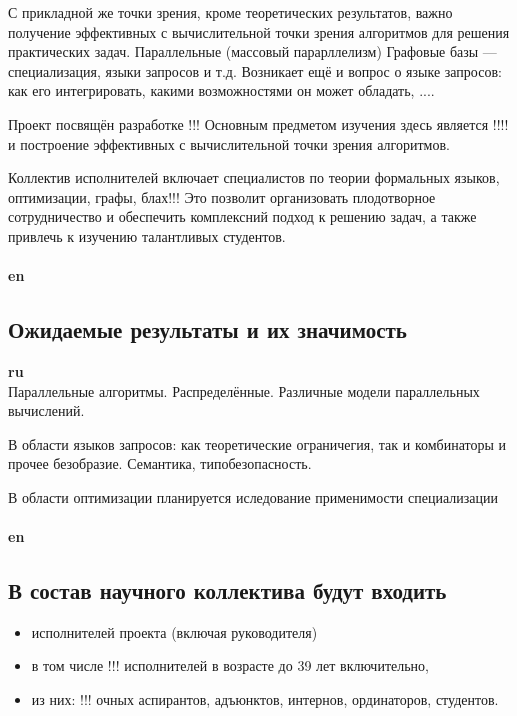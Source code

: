 \documentclass[12pt]{article}  %
\theoremstyle{remark}
\begin{document}
С прикладной же точки зрения, кроме теоретических результатов, важно получение эффективных с вычислительной точки зрения алгоритмов для решения практических задач.
Параллельные (массовый парарллелизм)
Графовые базы --- специализация, языки запросов и т.д.
Возникает ещё и вопрос о языке запросов: как его интегрировать, какими возможностями он может обладать, ....

Проект посвящён разработке !!!
Основным предметом изучения здесь является !!!! и построение эффективных с вычислительной точки зрения алгоритмов.

Коллектив исполнителей включает специалистов по теории формальных языков, оптимизации, графы, блах!!!
Это позволит организовать плодотворное сотрудничество и обеспечить комплексний подход к решению задач, а также привлечь к изучению талантливых студентов.
\\
\\
\textbf{en}\\

\subsection{Ожидаемые результаты и их значимость}

\textbf{ru}\\
%

Параллельные алгоритмы.
Распределённые.
Различные модели параллельных вычислений.

В области языков запросов: как теоретические ограничегия, так и комбинаторы и прочее безобразие.
Семантика, типобезопасность.

В области оптимизации планируется иследование применимости специализации 
\\
\\
\textbf{en}\\

\subsection{В состав научного коллектива будут входить}
%
\begin{itemize}
\item исполнителей проекта (включая руководителя)
\item в том числе !!!  исполнителей в возрасте до 39 лет включительно,
\item из них: !!! очных аспирантов, адъюнктов, интернов, ординаторов, студентов.
\end{itemize}
\end{document}
